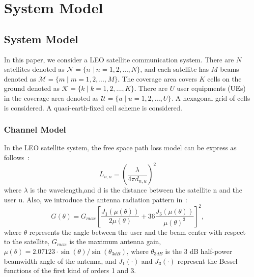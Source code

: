 \chapter{System Model}
\label{chap:model}


\section{System Model}
In this paper, we consider a LEO satellite communication system. 
There are $N$ satellites denoted as $\mathcal{N} = \{n \mid n = 1, 2, \ldots, N\}$, and each satellite has $M$ beams denoted as $\mathcal{M} = \{m \mid m = 1, 2, \ldots, M\}$. 
The coverage area covers $K$ cells on the ground denoted as $\mathcal{K} = \{k \mid k = 1, 2, \ldots, K\}$.
There are $U$ user equipments (UEs) in the coverage area denoted as $\mathcal{U} = \{u \mid u = 1, 2, \ldots, U\}$. 
A hexagonal grid of cells is considered. A quasi-earth-fixed cell scheme is considered.

\subsection{Channel Model}
In the LEO satellite system, the free space path loss model can be express as follows~\cite{Satellite-Multi-Beam}:
\begin{equation}
    L_{n,u} = \left(\frac{\lambda}{4\pi d_{n,u}}\right)^2
\end{equation}
where $\lambda$ is the wavelength,and d is the distance between the satellite n and the user u.
Also, we introduce the antenna radiation pattern in~\cite{Energy-Efficient}:
\begin{equation}
G(\theta) = G_{max} \left[ \frac{J_1\left(\mu(\theta)\right)}{2\mu(\theta)} 
+ 36 \frac{J_3\left(\mu(\theta)\right)}{\mu(\theta)^3} \right]^2,
\end{equation}
where $\theta$ represents the angle between the user and the beam center with respect to the satellite, $G_{max}$ is the maximum antenna gain, $\mu(\theta) = 2.07123\cdot \sin(\theta)/\sin(\theta_{3dB})$, 
where $\theta_{3dB}$ is the 3 dB half-power beamwidth angle of the antenna, and $J_1(\cdot)$ and $J_3(\cdot)$ represent the Bessel functions of the first kind of orders 1 and 3.

